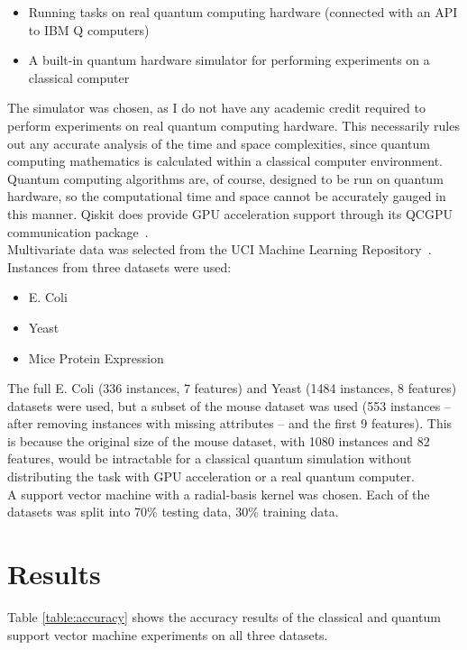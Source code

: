 \documentclass{article}
\begin{document}
    \begin{itemize}
      \item{Running tasks on real quantum computing hardware (connected with an API to IBM Q computers)}
      \item{A built-in quantum hardware simulator for performing experiments on a classical computer}
    \end{itemize}

  The simulator was chosen, as I do not have any academic credit required to perform experiments on real quantum computing hardware. This necessarily rules out any accurate analysis of the time and space complexities, since quantum computing mathematics is calculated within a classical computer environment. Quantum computing algorithms are, of course, designed to be run on quantum hardware, so the computational time and space cannot be accurately gauged in this manner. Qiskit does provide GPU acceleration support through its QCGPU communication package~\cite{qcgpu}. \\

  Multivariate data was selected from the UCI Machine Learning Repository~\cite{uci}. Instances from three datasets were used:

    \begin{itemize}
      \item E. Coli~\cite{ecoli}
      \item Yeast~\cite{yeast}
      \item Mice Protein Expression~\cite{mouse}
    \end{itemize}

  The full E. Coli (336 instances, 7 features) and Yeast (1484 instances, 8 features) datasets were used, but a subset of the mouse dataset was used (553 instances -- after removing instances with missing attributes -- and the first 9 features). This is because the original size of the mouse dataset, with 1080 instances and 82 features, would be intractable for a classical quantum simulation without distributing the task with GPU acceleration or a real quantum computer. \\

  A support vector machine with a radial-basis kernel was chosen. Each of the datasets was split into 70\% testing data, 30\% training data. \\

\section{Results}
    Table \ref{table:accuracy} shows the accuracy results of the classical and quantum support vector machine experiments on all three datasets. \\
\end{document}
